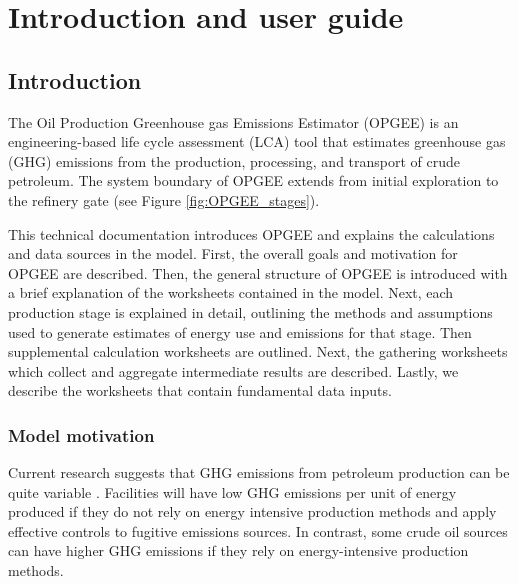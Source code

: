 \documentclass[11pt]{report}
\begin{document}

\part{Introduction and user guide}





\chapter{Introduction}

The Oil Production Greenhouse gas Emissions Estimator (OPGEE) is an engineering-based life cycle assessment (LCA) tool that estimates greenhouse gas (GHG) emissions from the production, processing, and transport of crude petroleum. The system boundary of OPGEE extends from initial exploration to the refinery gate (see Figure \ref{fig:OPGEE_stages}).

This technical documentation introduces OPGEE and explains the calculations and data sources in the model. First, the overall goals and motivation for OPGEE are described. Then, the general structure of OPGEE is introduced with a brief explanation of the worksheets contained in the model. Next, each production stage is explained in detail, outlining the methods and assumptions used to generate estimates of energy use and emissions for that stage. Then supplemental calculation worksheets are outlined. Next, the gathering worksheets which collect and aggregate intermediate results are described. Lastly, we describe the worksheets that contain fundamental data inputs.


\clearpage

\section{Model motivation}

Current research suggests that GHG emissions from petroleum production can be quite variable \cite{Keesom2009, Rosenfeld2009, Howarth2010, Skone2008, Gerdes2009, Brandt2011b, Charpentier2009a, Charpentier2011}. Facilities will have low GHG emissions per unit of energy produced if they do not rely on energy intensive production methods and apply effective controls to fugitive emissions sources. In contrast, some crude oil sources can have higher GHG emissions if they rely on energy-intensive production methods. 
\end{document}
